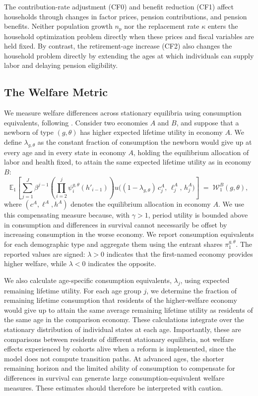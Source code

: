 \documentclass[12pt,a4paper]{article}
\newcommand{\E}{\mathbb{E}}
\begin{document}
The contribution-rate adjustment (CF0) and benefit reduction (CF1) affect households through changes in factor prices, pension contributions, and pension benefits. Neither population growth $n_p$ nor the replacement rate $\kappa$ enters the household optimization problem directly when these prices and fiscal variables are held fixed. By contrast, the retirement-age increase (CF2) also changes the household problem directly by extending the ages at which individuals can supply labor and delaying pension eligibility.


\subsection{The Welfare Metric}
\label{subsec:welfare_incidence}

We measure welfare differences across stationary equilibria using consumption equivalents, following \citet{DeNardiPashchenkoPorapakkarm2017}. Consider two economies $A$ and $B$, and suppose that a newborn of type $(g,\theta)$ has higher expected lifetime utility in economy $A$. We define $\lambda_{g,\theta}$ as the constant fraction of consumption the newborn would give up at every age and in every state in economy $A$, holding the equilibrium allocation of labor and health fixed, to attain the same expected lifetime utility as in economy $B$:
\begin{equation}
\label{eq:cev_newborn}
\E_1\!\left[\sum_{j=1}^{J} \beta^{j-1}\!\left(\prod_{i=2}^{j}\psi_{i}^{g,\theta}(h'_{i-1})\right) u\bigl((1-\lambda_{g,\theta})\,c_j^{A},\,\ell_j^{A},\,h_j^{A}\bigr)\right] \;=\; \mathcal{W}_1^{B}(g,\theta),
\end{equation}
where $(c^A,\ell^A,h^A)$ denotes the equilibrium allocation in economy $A$. We use this compensating measure because, with $\gamma>1$, period utility is bounded above in consumption and differences in survival cannot necessarily be offset by increasing consumption in the worse economy. We report consumption equivalents for each demographic type and aggregate them using the entrant shares $\pi_1^{g,\theta}$. The reported values are signed: $\lambda>0$ indicates that the first-named economy provides higher welfare, while $\lambda<0$ indicates the opposite.

We also calculate age-specific consumption equivalents, $\lambda_j$, using expected remaining lifetime utility. For each age group $j$, we determine the fraction of remaining lifetime consumption that residents of the higher-welfare economy would give up to attain the same average remaining lifetime utility as residents of the same age in the comparison economy. These calculations integrate over the stationary distribution of individual states at each age. Importantly, these are comparisons between residents of different stationary equilibria, not welfare effects experienced by cohorts alive when a reform is implemented, since the model does not compute transition paths. At advanced ages, the shorter remaining horizon and the limited ability of consumption to compensate for differences in survival can generate large consumption-equivalent welfare measures. These estimates should therefore be interpreted with caution.
\end{document}
